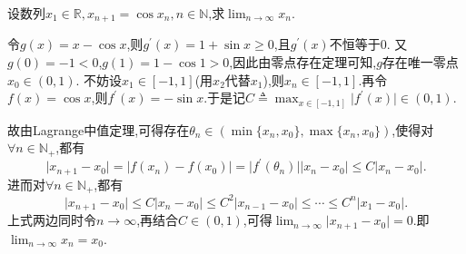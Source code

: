 \documentclass[../../main.tex]{subfiles}
\begin{document}
\begin{example}
设数列\(x_1\in\mathbb{R},x_{n + 1} = \cos x_n,n\in\mathbb{N}\),求\(\lim_{n \to \infty} x_n\).
\end{example}
\begin{solution}
令\(g(x)=x - \cos x\),则\(g^\prime(x)=1 + \sin x\geqslant0\),且\(g^\prime(x)\)不恒等于\(0\).
又\(g(0)= -1 < 0\),\(g(1)=1 - \cos 1 > 0\),因此由零点存在定理可知,\(g\)存在唯一零点\(x_0\in(0,1)\).
不妨设\(x_1\in[-1,1]\)(用\(x_2\)代替\(x_1\)),则\(x_n\in[-1,1]\).再令\(f(x)=\cos x\),则\(f^\prime(x)=-\sin x\).于是记\(C\triangleq \max_{x\in[-1,1]}\vert f^\prime(x)\vert\in(0,1)\).

故由Lagrange中值定理,可得存在\(\theta_n\in(\min\{x_n,x_0\},\max\{x_n,x_0\})\),使得对\(\forall n\in\mathbb{N}_+\),都有
\[
\vert x_{n + 1}-x_0\vert=\vert f(x_n)-f(x_0)\vert=\vert f^\prime(\theta_n)\vert\vert x_n - x_0\vert\leqslant C\vert x_n - x_0\vert.
\]
进而对\(\forall n\in\mathbb{N}_+\),都有
\[
\vert x_{n + 1}-x_0\vert\leqslant C\vert x_n - x_0\vert\leqslant C^2\vert x_{n - 1}-x_0\vert\leqslant\cdots\leqslant C^n\vert x_1 - x_0\vert.
\]
上式两边同时令\(n\rightarrow\infty\),再结合\(C\in(0,1)\),可得\(\lim_{n\rightarrow\infty}\vert x_{n + 1}-x_0\vert = 0\).即\(\lim_{n\rightarrow\infty}x_n = x_0\).
\end{solution}
\end{document}
